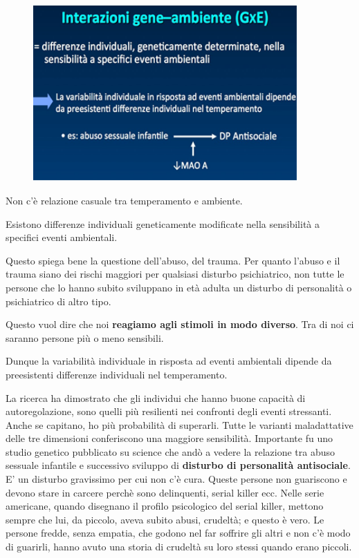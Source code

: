 \begin{figure}[!ht]
\centering
	\includegraphics[width=0.9\textwidth]{011/image5.png}
\end{figure}

Non
c'è relazione casuale tra temperamento e ambiente.

Esistono differenze individuali geneticamente modificate nella
sensibilità a specifici eventi ambientali.

Questo spiega bene la questione dell'abuso, del trauma. Per quanto
l'abuso e il trauma siano dei rischi maggiori per qualsiasi disturbo
psichiatrico, non tutte le persone che lo hanno subito sviluppano in età
adulta un disturbo di personalità o psichiatrico di altro tipo.

Questo vuol dire che noi \textbf{reagiamo agli stimoli in modo diverso}.
Tra di noi ci saranno persone più o meno sensibili.

Dunque la variabilità individuale in risposta ad eventi ambientali
dipende da preesistenti differenze individuali nel temperamento.

La ricerca ha dimostrato che gli individui che hanno buone capacità di
autoregolazione, sono quelli più resilienti nei confronti degli eventi
stressanti. Anche se capitano, ho più probabilità di superarli. Tutte le
varianti maladattative delle tre dimensioni conferiscono una maggiore
sensibilità. Importante fu uno studio genetico pubblicato su science che
andò a vedere la relazione tra abuso sessuale infantile e successivo
sviluppo di \textbf{disturbo di personalità antisociale}. E' un disturbo
gravissimo per cui non c'è cura. Queste persone non guariscono e devono
stare in carcere perchè sono delinquenti, serial killer ecc. Nelle serie
americane, quando disegnano il profilo psicologico del serial killer,
mettono sempre che lui, da piccolo, aveva subito abusi, crudeltà; e
questo è vero. Le persone fredde, senza empatia, che godono nel far
soffrire gli altri e non c'è modo di guarirli, hanno avuto una storia di
crudeltà su loro stessi quando erano piccoli.

